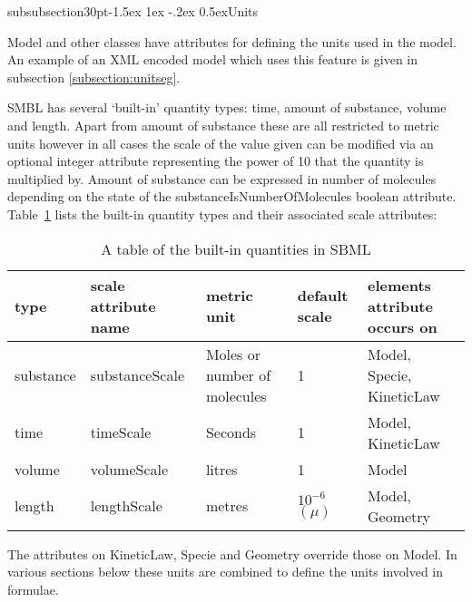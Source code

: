 \documentclass[10pt]{article}
\makeatletter
\renewcommand{\subsubsection}{\@startsection%
  {subsubsection}{3}{0pt}{-1.5ex \@plus 1ex \@minus -.2ex}%
  {0.5ex}{\slshape\normalsize\bfseries}}
\newcommand{\class}[1]{\textsf{#1}}
\newcommand{\attrib}[1]{\textsf{#1}}
\makeatother
\begin{document}
\subsubsection{Units}

\class{Model} and other classes have attributes for defining the
units used in the model.  An example of an XML encoded model which
uses this feature is given in subsection \ref{subsection:unitseg}.

SMBL has several `built-in' quantity
types: time, amount of substance, volume and length.  Apart from
amount of substance these are all restricted to metric units
however in all cases the scale of the value given can be modified
via an optional integer attribute representing the power of 10
that the quantity is multiplied by.  Amount of substance can be
expressed in number of molecules depending on the state of the
\attrib{substanceIsNumberOfMolecules} boolean attribute.  Table~\ref{tab:builtin} lists the built-in quantity types and
their associated scale attributes:

\begin{table}[h]
\begin{tabular}{|l|l|l|l|l|}
  \hline
  type & scale attribute name & metric unit & default scale & elements attribute occurs on \\ \hline

  substance & substanceScale & Moles or number of molecules & 1 & \class{Model}, \class{Specie}, \class{KineticLaw} \\
  time & timeScale & Seconds & 1 & \class{Model}, \class{KineticLaw} \\
  volume & volumeScale & litres & 1 & \class{Model} \\
  length & lengthScale & metres & $10^{-6}$ $(\mu)$ & \class{Model}, \class{Geometry}
  \\ \hline

\end{tabular}
\caption{A table of the built-in quantities in SBML}

\label{tab:builtin}
\end{table}

The attributes on \class{KineticLaw}, \class{Specie} and
\class{Geometry} override those on \class{Model}. In various
sections below these units are combined to define the units
involved in formulae.

\end{document}
